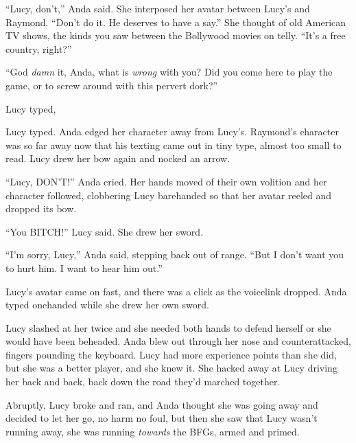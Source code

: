 “Lucy, don’t,” Anda said. She interposed her avatar between Lucy’s
and Raymond. “Don’t do it. He deserves to have a say.” She thought
of old American TV shows, the kinds you saw between the Bollywood
movies on telly. “It’s a free country, right?”

“God \emph{damn} it, Anda, what is \emph{wrong} with you? Did you
come here to play the game, or to screw around with this pervert
dork?”

Lucy typed,

Lucy typed. Anda edged her character away from Lucy’s. Raymond’s
character was so far away now that his texting came out in tiny
type, almost too small to read. Lucy drew her bow again and nocked
an arrow.

“Lucy, DON’T!” Anda cried. Her hands moved of their own volition
and her character followed, clobbering Lucy barehanded so that her
avatar reeled and dropped its bow.

“You BITCH!” Lucy said. She drew her sword.

“I’m sorry, Lucy,” Anda said, stepping back out of range. “But I
don’t want you to hurt him. I want to hear him out.”

Lucy’s avatar came on fast, and there was a click as the voicelink
dropped. Anda typed onehanded while she drew her own sword.

Lucy slashed at her twice and she needed both hands to defend
herself or she would have been beheaded. Anda blew out through her
nose and counterattacked, fingers pounding the keyboard. Lucy had
more experience points than she did, but she was a better player,
and she knew it. She hacked away at Lucy driving her back and back,
back down the road they’d marched together.

Abruptly, Lucy broke and ran, and Anda thought she was going away
and decided to let her go, no harm no foul, but then she saw that
Lucy wasn’t running away, she was running \emph{towards} the BFGs,
armed and primed.

